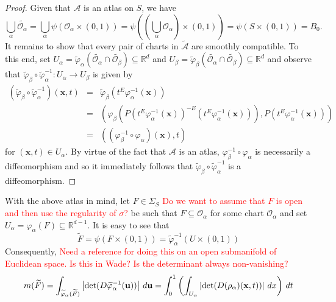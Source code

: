 \documentclass[11pt]{article}
\theoremstyle{theorem}
\renewcommand\det{\operatorname{det}}
\begin{document}
\begin{proof}
Given that $\mathcal{A}$ is an atlas on $S$, we have
\begin{equation*}
\bigcup_\alpha \widetilde{\mathcal{O}_\alpha}=\bigcup_{\alpha}\psi(\mathcal{O}_\alpha\times (0,1))=\psi\left(\left(\bigcup_\alpha \mathcal{O}_\alpha\right)\times (0,1)\right)=\psi(S\times (0,1))=B_0.
\end{equation*}
It remains to show that every pair of charts in $\widetilde{\mathcal{A}}$ are smoothly compatible. To this end, set $U_\alpha=\widetilde{\varphi}_{\alpha}(\widetilde{\mathcal{O}_\alpha}\cap\widetilde{\mathcal{O}_\beta})\subseteq \mathbb{R}^d$ and $U_\beta=\widetilde{\varphi}_{\beta}(\widetilde{\mathcal{O}_\alpha}\cap\widetilde{\mathcal{O}_\beta})\subseteq \mathbb{R}^d$ and observe that $\widetilde{\varphi}_\beta\circ \widetilde{\varphi}_\alpha^{-1}:U_\alpha\to U_\beta$ is given by
\begin{eqnarray*}
\left(\widetilde{\varphi}_\beta\circ \widetilde{\varphi}_\alpha^{-1}\right)(\mathbf{x},t)&=&\widetilde{\varphi}_\beta\left(t^{E}\varphi_\alpha^{-1}(\mathbf{x})\right)\\
&=&\left(\varphi_{\beta}\left(P(t^E\varphi_{\alpha}^{-1}(\mathbf{x}))^{-E}\left(t^E\varphi_{\alpha}^{-1}(\mathbf{x})\right)\right),P\left(t^E\varphi_{\alpha}^{-1}(\mathbf{x})\right)\right)\\
&=&\left(\left(\varphi_\beta^{-1}\circ\varphi_\alpha\right)(\mathbf{x}),t\right)
\end{eqnarray*}
for $(\mathbf{x},t)\in U_\alpha$. By virtue of the fact that $\mathcal{A}$ is an atlas,  $\varphi_\beta^{-1}\circ\varphi_\alpha$ is necessarily a diffeomorphism and so it immediately follows that $\widetilde{\varphi}_\beta\circ \widetilde{\varphi}_\alpha^{-1}$ is a diffeomorphism.
\end{proof}
With the above atlas in mind, let $F\in\Sigma_S$ \textcolor{red}{Do we want to assume that $F$ is open and then use the regularity of $\sigma$?} be such that $F\subseteq \mathcal{O}_\alpha$ for some chart $\mathcal{O}_\alpha$ and set $U_\alpha=\varphi_{\alpha}(F)\subseteq \mathbb{R}^{d-1}$. It is easy to see that
\begin{equation*}
\widetilde{F}=\psi(F\times (0,1))=\widetilde{\varphi}_\alpha^{-1}(U\times (0,1))
\end{equation*}
Consequently, \textcolor{red}{Need a reference for doing this on an open submanifold of Euclidean space. Is this in Wade? Is the determinant always non-vanishing?}
\begin{equation}\label{eq:CoordinateFormulaTilde1}
m(\widetilde{F})=\int_{\widetilde{\varphi}_\alpha(\widetilde{F})} \left|\det(D\widetilde{\varphi}^{-1}_\alpha(\mathbf{u}))\right| \,d\mathbf{u}\\
=\int_0^1\left(\int_{U_\alpha}\left|\det(D(\rho_\alpha)(\mathbf{x},t))\right|\,dx\right)\,dt
\end{equation}
\end{document}
